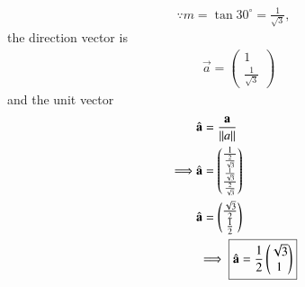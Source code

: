 
 \begin{align}
\because  m = \tan{30^{\circ}} = \frac{1}{\sqrt{3}},
\end{align}
the direction vector is 
 \begin{align}
& \vec{a}  = \begin{pmatrix} 1 \\ \frac{1}{\sqrt{3}} \end{pmatrix}
\end{align}
and the 
unit vector 
 \begin{align}
& \hat{\textbf{a}}  = \frac{\mathbf{a}}{\left\lVert a\right\rVert}\\
\implies  & \hat{\textbf{a}}  = \begin{pmatrix}
\frac{1}{\frac{2}{\sqrt{3}}}\\
\frac{\frac{1}{\sqrt{3}}}{\frac{2}{\sqrt{3}}}
\end{pmatrix}\\
& \hat{\textbf{a}}  = \begin{pmatrix}
\frac{\sqrt{3}}{2}\\
\frac{1}{2}
\end{pmatrix}\\
& \implies \boxed{\hat{\textbf{a}}  = \frac{1}{2}\begin{pmatrix}
\sqrt{3}\\
1
\end{pmatrix}}
\end{align}

